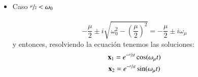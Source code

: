 \begin{eg}
\begin{itemize}
        \item Caso $\sfrac{\mu}{2} < \omega_0$\\\\
        $$
            -\frac{\mu}{2} \pm i \sqrt{\omega_0^2 - \left(\frac{\mu}{2}\right)^2} = -\frac{\mu}{2} \pm i \omega_\mu
        $$
        y entonces, resolviendo la ecuación tenemos las soluciones:
        \begin{gather*}
            \mathbf{x}_1 = e^{-\sfrac{\mu}{2} t} \cos(\omega_\mu t)\\
            \mathbf{x}_2 = e^{-\sfrac{\mu}{2} t} \sin(\omega_\mu t)
        \end{gather*}
    \end{itemize}
\end{eg}

